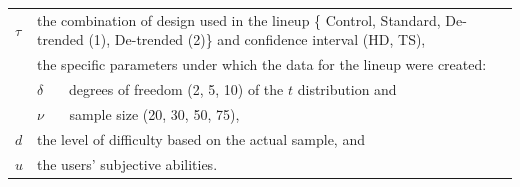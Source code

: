 \documentclass{article}\usepackage[]{graphicx}\usepackage[]{color}
\begin{document}
\begin{appendix}
\begin{center}
\begin{tabular}{lp{5in}}
$\tau$ & the combination of design used in the lineup  \{ Control, Standard, De-trended (1), De-trended (2)\} and confidence interval (HD, TS), \\
&  the specific parameters under which the data for the lineup were created: \\
&  $\delta$ \ \ \ degrees of freedom (2, 5, 10) {of the $t$ distribution} and \\
&  $\nu$  \ \ \ sample size (20, 30, 50, 75), \\
$d$ &  the level of difficulty based on the actual sample, and \\
$u$ & the users' subjective abilities.
 \end{tabular}
\end{center}
%

%




\end{appendix}
\end{document}
